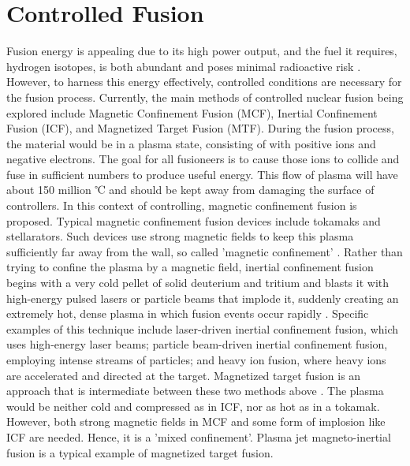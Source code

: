 \section{Controlled Fusion}
\label{section1.2}
Fusion energy is appealing due to its high power output, and the fuel it requires, hydrogen isotopes, is both abundant and poses minimal radioactive risk \cite{moynihan2023fusion}. However, to harness this energy effectively, controlled conditions are necessary for the fusion process. Currently, the main methods of controlled nuclear fusion being explored include Magnetic Confinement Fusion (MCF), Inertial Confinement Fusion (ICF), and Magnetized Target Fusion (MTF). During the fusion process, the material would be in a plasma state, consisting of with positive ions and negative electrons. The goal for all fusioneers is to cause those ions to collide and fuse in sufficient numbers to produce useful energy. This flow of plasma will have about 150 million ℃ \cite{ongena2016magnetic} and should be kept away from damaging the surface of controllers. In this context of controlling, magnetic confinement fusion is proposed. Typical magnetic confinement fusion devices include tokamaks and stellarators. Such devices use strong magnetic fields to keep this plasma sufficiently far away from the wall, so called 'magnetic confinement' \cite{ongena2016magnetic}. Rather than trying to confine the plasma by a magnetic field, inertial confinement fusion begins with a very cold pellet of solid deuterium and tritium and blasts it with high-energy pulsed lasers or particle beams that implode it, suddenly creating an extremely hot, dense plasma in which fusion events occur rapidly \cite{moynihan2023fusion}. Specific examples of this technique include laser-driven inertial confinement fusion, which uses high-energy laser beams; particle beam-driven inertial confinement fusion, employing intense streams of particles; and heavy ion fusion, where heavy ions are accelerated and directed at the target. Magnetized target fusion is an approach that is intermediate between these two methods above \cite{moynihan2023fusion, kirkpatrick1997magnetized}. The plasma would be neither cold and compressed as in ICF, nor as hot as in a tokamak. However, both strong magnetic fields in MCF and some form of implosion like ICF are needed. Hence, it is a 'mixed confinement'. Plasma jet magneto-inertial fusion is a typical example of magnetized target fusion. 





